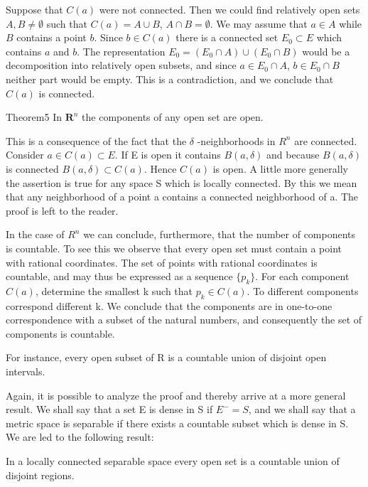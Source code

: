 Suppose that $C(a)$ were not connected. Then we could find relatively open sets $A, B \neq \emptyset$ such that $C(a) = A \cup B$, $A \cap B = \emptyset$. We may assume that $a \in A$ while $B$ contains a point $b$. Since $b \in C(a)$ there is a connected set $E_0 \subset E$ which contains $a$ and $b$. The representation $E_0 = (E_0 \cap A) \cup (E_0 \cap B)$ would be a decomposition into relatively open subsets, and since $a \in E_0 \cap A$, $b \in E_0 \cap B$ neither part would be empty. This is a contradiction, and we conclude that $C(a)$ is connected.


\begin{originalstatement}{Theorem}{5}\label{thm:3.5}
In $\mathbf{R}^n$ the components of any open set are open.
\end{originalstatement}
This is a consequence of the fact that the $\delta$ -neighborhoods in $R^{n}$ are connected. Consider $a \in C(a) \subset E$. If E is open it contains $B(a, \delta)$ and because $B(a, \delta)$ is connected $B(a, \delta) \subset C(a)$. Hence $C(a)$ is open. A little more generally the assertion is true for any space S which is locally connected. By this we mean that any neighborhood of a point a contains a connected neighborhood of a. The proof is left to the reader.

In the case of $R^{n}$ we can conclude, furthermore, that the number of components is countable. To see this we observe that every open set must contain a point with rational coordinates. The set of points with rational coordinates is countable, and may thus be expressed as a sequence $\{p_{k}\}$. For each component $C(a)$, determine the smallest k such that $p_{k} \in C(a)$. To different components correspond different k. We conclude that the components are in one-to-one correspondence with a subset of the natural numbers, and consequently the set of components is countable.

For instance, every open subset of R is a countable union of disjoint open intervals.

Again, it is possible to analyze the proof and thereby arrive at a more general result. We shall say that a set E is dense in S if $E^{-} = S$, and we shall say that a metric space is separable if there exists a countable subset which is dense in S. We are led to the following result:

In a locally connected separable space every open set is a countable union of disjoint regions.


